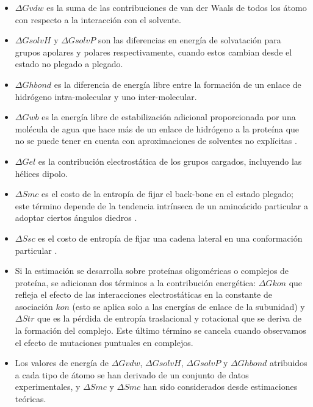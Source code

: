\begin{itemize}
	
	\item $\Delta Gvdw$ es la suma de las contribuciones de van der Waals de todos los átomo con respecto a la interacción con el solvente.
	
	\item $\Delta GsolvH$ y $\Delta GsolvP$ son las diferencias en energía de solvatación para grupos apolares y polares respectivamente, cuando estos cambian desde el estado no plegado a plegado.
	
	\item $\Delta Ghbond$ es la diferencia de energía libre entre la formación de un enlace de hidrógeno intra-molecular y uno inter-molecular.
	
	\item $\Delta Gwb$ es la energía libre de estabilización adicional proporcionada por una molécula de agua que hace más de un enlace de hidrógeno a la proteína que no se puede tener en cuenta con aproximaciones de solventes no explícitas \cite{petukhov1999local}. 
	
	\item $\Delta Gel$ es la contribución electrostática de los grupos cargados, incluyendo las hélices dipolo. 
	
	\item $\Delta Smc$ es el costo de la entropía de fijar el back-bone en el estado plegado; este término depende de la tendencia intrínseca de un aminoácido particular a adoptar ciertos ángulos diedros \cite{munoz1996local, munoz1995hydrophobic}. 
	
	\item $\Delta Ssc$ es el costo de entropía de fijar una cadena lateral en una conformación particular \cite{abagyan1994biased}. 
	
	\item Si la estimación se desarrolla sobre proteínas oligoméricas o complejos de proteína, se adicionan dos términos a la contribución energética: $\Delta Gkon$ que refleja el efecto de las interacciones electrostáticas en la constante de asociación $kon$ (esto se aplica solo a las energías de enlace de la subunidad) \cite{vijayakumar1998electrostatic} y $\Delta Str$ que es la pérdida de entropía traslacional y rotacional que se deriva de la formación del complejo. Este último término se cancela cuando observamos el efecto de mutaciones puntuales en complejos. 
	
	\item Los valores de energía de $\Delta Gvdw$, $\Delta GsolvH$, $\Delta GsolvP$ y $\Delta Ghbond$ atribuidos a cada tipo de átomo se han derivado de un conjunto de datos experimentales, y $\Delta Smc$ y $\Delta Smc$ han sido considerados desde estimaciones teóricas. 
	

\end{itemize}
